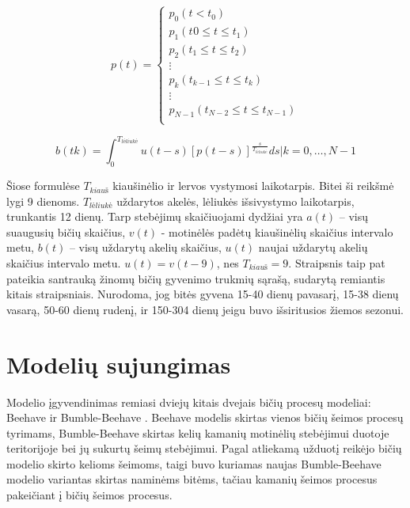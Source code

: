 \documentclass{VUMIFKompMagistrinis}
\begin{document}
\begin{equation}
\label{emir4}
p(t)=
\begin{cases}
p_{0} (t<t_0 )                                           \\
p_{1} (t_{}0≤t≤t_{1} )                          \\
p_{2} (t_{1}≤t≤t_{2} )                                \\
\vdots \\
p_{k} (t_{k-1}≤t≤t_{k} )                               \\
\vdots \\
p_{N-1} (t_{N-2}≤t≤t_{N-1} )   \\
\end{cases}
\end{equation}

\begin{equation}
\label{emir5}
b(tk)=\int_{0}^{T_{l\text{\.e}liuk\text{\.e}}}u(t-s) [p(t-s)]^{\frac{s}{T_{l\text{\.e}liuk\text{\.e}}}} ds | k=0,…,N-1
\end{equation}

Šiose formulėse $T_{kiau\textit{\v{s}}}$ kiaušinėlio ir lervos vystymosi laikotarpis. Bitei ši reikšmė lygi 9 dienoms. $T_{l\textit{\.e}liuk\textit{\.e}}$ uždarytos akelės, lėliukės išsivystymo laikotarpis, trunkantis 12 dienų. Tarp stebėjimų skaičiuojami dydžiai yra $a(t)$ – visų suaugusių bičių skaičius, $v(t)$ - motinėlės padėtų kiaušinėlių skaičius intervalo metu, $b(t)$ – visų uždarytų akelių skaičius, $u(t)$ naujai uždarytų akelių skaičius intervalo metu. $u(t)=v(t-9)$, nes $T_{kiau\textit{\v{s}}}=9$. 
Straipsnis taip pat pateikia santrauką žinomų bičių gyvenimo trukmių sąrašą, sudarytą remiantis kitais straipsniais. Nurodoma, jog bitės gyvena 15-40 dienų pavasarį, 15-38 dienų vasarą, 50-60 dienų rudenį, ir 150-304 dienų jeigu buvo išsiritusios žiemos sezonui.




\section{Modelių sujungimas}

Modelio įgyvendinimas remiasi dviejų kitais dvejais bičių procesų modeliai: Beehave \cite{BGT14} ir Bumble-Beehave \cite{BDP18}. Beehave modelis skirtas vienos bičių šeimos procesų tyrimams, Bumble-Beehave skirtas kelių kamanių motinėlių stebėjimui duotoje teritorijoje bei jų sukurtų šeimų stebėjimui. Pagal atliekamą užduotį reikėjo bičių modelio skirto kelioms šeimoms, taigi buvo kuriamas naujas Bumble-Beehave modelio variantas skirtas naminėms bitėms, tačiau kamanių šeimos procesus pakeičiant į bičių šeimos procesus.
\end{document}
